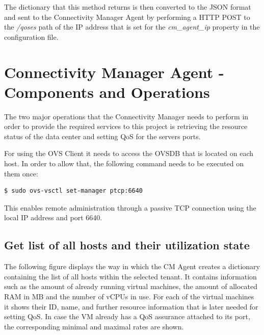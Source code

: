 The dictionary that this method returns is then converted to the JSON format and sent to the Connectivity Manager Agent by performing a HTTP POST to the \textit{/qoses} path of the IP address that is set for the \textit{cm\_agent\_ip} property in the configuration file.

\section{Connectivity Manager Agent - Components and Operations}

The two major operations that the Connectivity Manager needs to perform in order to provide the required services to this project is retrieving the resource status of the data center and setting QoS for the servers ports.

For using the OVS Client it needs to access the OVSDB that is located on each host. In order to allow that, the following command needs to be executed on them once:
\begin{lstlisting}[language=commands]
$ sudo ovs-vsctl set-manager ptcp:6640
\end{lstlisting}

This enables remote administration through a passive TCP connection using the local IP address and port 6640. 

\subsection{Get list of all hosts and their utilization state}

The following figure displays the way in which the CM Agent creates a dictionary containing the list of all hosts within the selected tenant. It contains information such as the amount of already running virtual machines, the amount of allocated RAM in MB and the number of vCPUs in use. For each of the virtual machines it shows their ID, name, and further resource information that is later needed for setting QoS. In case the VM already has a QoS assurance attached to its port, the corresponding minimal and maximal rates are shown.

